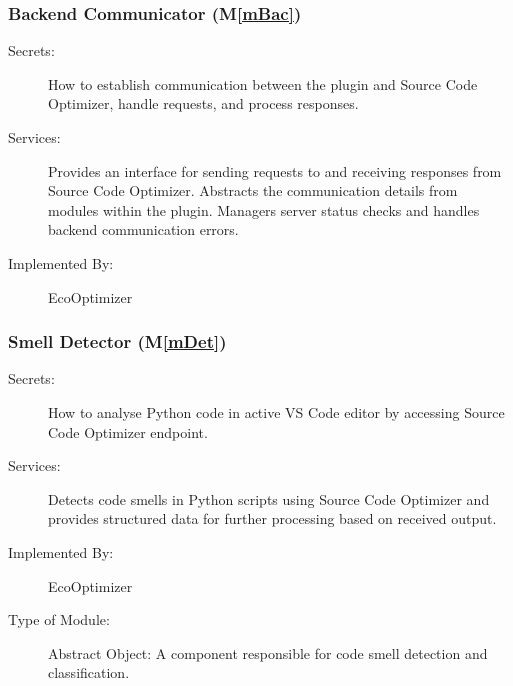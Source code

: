 \documentclass[12pt, titlepage]{article}
\newcommand{\mref}[1]{M\ref{#1}}
\begin{document}
\subsubsection{Backend Communicator (\mref{mBac})}


\begin{description}
    \item[Secrets:] How to establish communication between the plugin and Source Code Optimizer, handle requests, and process responses.
    \item[Services:] Provides an interface for sending requests to and receiving responses from Source Code Optimizer. Abstracts the communication details from modules within the plugin. Managers server status checks and handles backend communication errors.
    \item[Implemented By:] EcoOptimizer
\end{description}

\subsubsection{Smell Detector (\mref{mDet})}


\begin{description}
    \item[Secrets:] How to analyse Python code in active VS Code editor by accessing Source Code Optimizer endpoint.
    \item[Services:] Detects code smells in Python scripts using Source Code Optimizer and provides structured data for further processing based on received output.
    \item[Implemented By:] EcoOptimizer
    \item[Type of Module:] Abstract Object: A component responsible for code smell detection and classification.
\end{description}
\end{document}
